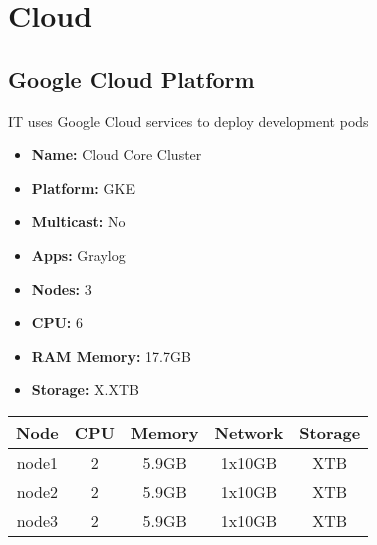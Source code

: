 \newpage
\section{Cloud}
\subsection{Google Cloud Platform}
IT uses Google Cloud services to deploy development pods
\begin{itemize}
  \itemsep0em 
  \item \textbf{Name:}       Cloud Core Cluster
  \item \textbf{Platform:}   GKE
  \item \textbf{Multicast:}  No
  \item \textbf{Apps:}       Graylog
  \item \textbf{Nodes:}      3
  \item \textbf{CPU:}        6
  \item \textbf{RAM Memory:} 17.7GB
  \item \textbf{Storage:} X.XTB
\end{itemize}
\begin{center}
  \small
  \begin{tabular}{||c c c c c||}
    \hline
    \textbf{Node} & \textbf{CPU} & \textbf{Memory} & \textbf{Network} & \textbf{Storage} \\ [0.5ex]
    \hline
    node1 & 2 & 5.9GB & 1x10GB & XTB \\
    \hline
    node2 & 2 & 5.9GB & 1x10GB & XTB \\
    \hline
    node3 & 2 & 5.9GB & 1x10GB & XTB \\
    \hline
  \end{tabular}
\end{center}